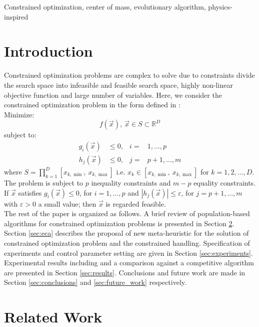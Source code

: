\documentclass[conference]{IEEEtran}
\begin{document}
\begin{IEEEkeywords}
Constrained optimization, center of mass, evolutionary algorithm, physics-inspired
\end{IEEEkeywords}

\section{Introduction}
Constrained optimization problems are complex to solve due to constraints divide 
the search space into infeasible and feasible search space, highly non-linear 
objective function and large number of variables. Here, we consider the constrained 
optimization problem in the form defined in \cite{cecCop17}:\\

\noindent
Minimize:
\begin{equation}
	f(\vec{x}),\ \vec{x}  \in S \subset \mathbb{R}^D
	\label{eqn:fx}
\end{equation}
%
subject to:
\begin{align*}
	g_i(\vec{x}) &\leq 0,& i =&  1 , \ldots, p \\
	h_j(\vec{x}) &\leq 0,& j =& p+1, \ldots, m
\end{align*}
%
where $S = \prod_{k = 1}^D  [ x_{k,\min},\ x_{k,\max} ]$ i.e. 
$x_k \in [ x_{k,\min},\ x_{k,\max} ]$ for $k = 1,2,\ldots,D$.  The problem is 
subject to $p$ inequality constraints and $m - p$ equality constraints. If 
$\vec{x}$ satisfies $g_i( \vec{x} ) \leq 0$, for $i = 1, \ldots, p$ and 
$|h_j(\vec{x})| \leq \varepsilon$, for $j = p+1, \ldots, m$ with 
$\varepsilon > 0$ a small value; then $\vec{x}$ is regarded feasible.\\


The rest of the paper is organized as follows. A brief review of population-based 
algorithms for constrained optimization problems is presented in Section \ref{sec:related_work}. 
Section \ref{sec:eca} describes the proposal of new meta-heuristic for the solution 
of constrained optimization problem and the constrained handling. Specification of 
experiments and control parameter setting are given in Section \ref{sec:experiments}. 
Experimental results including and a comparison against a competitive algorithm 
are presented in Section \ref{sec:results}. Conclusions and future work are made 
in Section \ref{sec:conclusions} and \ref{sec:future_work} respectively.


\section{Related Work} %
\label{sec:related_work}
\end{document}
